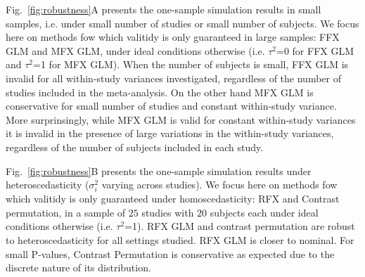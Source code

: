 \documentclass[preprint]{elsarticle}
\newcommand{\varBetween}{\tau^2}
\newcommand{\varWithin}[1][i]{\sigma^2_{#1}}
\begin{document}
Fig.~\ref{fig:robustness}A presents the one-sample simulation results in small samples, i.e. under small number of studies or small number of subjects. We focus here on methods fow which valitidy is only guaranteed in large samples: FFX GLM and MFX GLM, under ideal conditions otherwise (i.e. $\varBetween$=0 for FFX GLM and $\varBetween$=1 for MFX GLM). When the number of subjects is small, FFX GLM is invalid for all within-study variances investigated, regardless of the number of studies included in the meta-analysis. On the other hand MFX GLM is conservative for small number of studies and constant within-study variance. More surprinsingly, while MFX GLM is valid for constant within-study variances it is invalid in the presence of large variations in the within-study variances, regardless of the number of subjects included in each study. 




Fig.~\ref{fig:robustness}B presents the one-sample simulation results under heteroscedasticity ($\varWithin$ varying across studies). We focus here on methods fow which valitidy is only guaranteed under homoscedasticity: RFX and Contrast permutation, in a sample of $25$ studies with $20$ subjects each under ideal conditions otherwise (i.e. $\varBetween$=1). RFX GLM and contrast permutation are robust to heteroscedasticity for all settings studied. RFX GLM is closer to nominal. For small P-values, Contrast Permutation is conservative as expected due to the discrete nature of its distribution.
\end{document}
